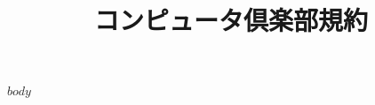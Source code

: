 \documentclass{article}
\title{{\Huge \textbf{コンピュータ倶楽部規約}}}
\begin{document}
\maketitle

$body$
\end{document}
